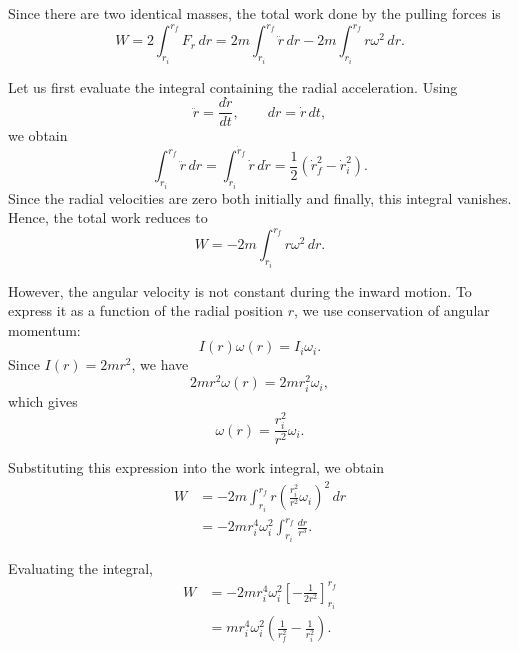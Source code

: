 \documentclass[12pt]{article}
\begin{document}
Since there are two identical masses, the total work done by the pulling forces is
\begin{equation}
    W=2\int_{r_i}^{r_f}F_r\,dr
    =2m\int_{r_i}^{r_f}\ddot{r}\,dr
    -2m\int_{r_i}^{r_f}r\omega^2\,dr.
\end{equation}

Let us first evaluate the integral containing the radial acceleration. Using
\begin{equation}
    \ddot{r}=\frac{d\dot{r}}{dt},
    \qquad
    dr=\dot{r}\,dt,
\end{equation}
we obtain
\begin{equation}
    \int_{r_i}^{r_f}\ddot{r}\,dr
    =\int_{\dot{r}_i}^{\dot{r}_f}\dot{r}\,d\dot{r}
    =\frac{1}{2}\left(\dot{r}_f^2-\dot{r}_i^2\right).
\end{equation}
Since the radial velocities are zero both initially and finally, this integral vanishes. Hence, the total work reduces to
\begin{equation}
    W=-2m\int_{r_i}^{r_f}r\omega^2\,dr.
\end{equation}

However, the angular velocity is not constant during the inward motion. To express it as a function of the radial position $r$, we use conservation of angular momentum:
\begin{equation}
    I(r)\omega(r)=I_i\omega_i.
\end{equation}
Since $I(r)=2mr^2$, we have
\begin{equation}
    2mr^2\omega(r)=2mr_i^2\omega_i,
\end{equation}
which gives
\begin{equation}
    \omega(r)=\frac{r_i^2}{r^2}\omega_i.
\end{equation}

Substituting this expression into the work integral, we obtain
\begin{align}
    W
    &=-2m\int_{r_i}^{r_f}
    r\left(\frac{r_i^2}{r^2}\omega_i\right)^2\,dr\\
    &=-2mr_i^4\omega_i^2
    \int_{r_i}^{r_f}\frac{dr}{r^3}.
\end{align}

Evaluating the integral,
\begin{align}
    W
    &=-2mr_i^4\omega_i^2
    \left[-\frac{1}{2r^2}\right]_{r_i}^{r_f}\\
    &=mr_i^4\omega_i^2
    \left(\frac{1}{r_f^2}-\frac{1}{r_i^2}\right).
\end{align}
\end{document}
